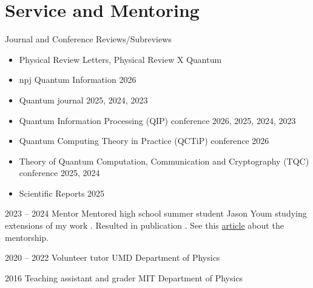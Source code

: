 \section{Service and Mentoring}

\cventry
  {}
  {Journal and Conference Reviews/Subreviews}
  {}
  {}
  {}
  {
    \begin{itemize}
        \item Physical Review Letters, Physical Review X Quantum
        \item npj Quantum Information 2026
        \item Quantum journal 2025, 2024, 2023
        \item Quantum Information Processing (QIP) conference 2026, 2025, 2024, 2023
        \item Quantum Computing Theory in Practice (QCTiP) conference 2026
        \item Theory of Quantum Computation, Communication and Cryptography (TQC) conference 2025, 2024
        \item Scientific Reports 2025
    \end{itemize}
  }


\cventry
    {2023 -- 2024}
    {Mentor}
    {}
    {}
    {}
    {Mentored high school summer student Jason Youm studying extensions of my work \cite{iosue2023page-curves-and}. Resulted in publication \cite{youm2025average-renyi-e}. See this \href{https://quics.umd.edu/news/high-school-student-earns-accolades-2023-summer-research-gorshkov-group}{article} about the mentorship.}


\cventry
  {2020 -- 2022}
  {Volunteer tutor}
  {UMD Department of Physics}
  {}
  {}
  {}

\cventry
  {2016}
  {Teaching assistant and grader}
  {MIT Department of Physics}
  {}
  {}
  {}
